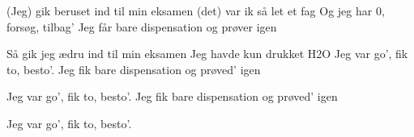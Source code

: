\documentclass[a4paper,11pt]{article}
\begin{document}
\begin{song}
 (Jeg) gik beruset ind til min eksamen
(det) var ik så let et fag
 Og jeg har 0, forsøg, tilbag'
Jeg får bare dispensation og prøver igen 


 Så gik jeg ædru ind til min eksamen
Jeg havde kun drukket H2O
 Jeg var go', fik to, besto'.
 Jeg fik bare dispensation og prøved' igen 

 Jeg var go', fik to, besto'.
 Jeg fik bare dispensation og prøved' igen 

 Jeg var go', fik to, besto'.

\end{song}
\end{document}
